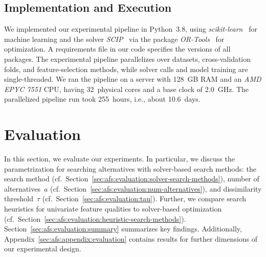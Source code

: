 \documentclass{article}
\theoremstyle{definition}
\begin{document}
\subsection{Implementation and Execution}
\label{sec:afs:experimental-design:implementation}

We implemented our experimental pipeline in Python~3.8, using \emph{scikit-learn}~\cite{pedregosa2011scikit-learn} for machine learning and the solver \emph{SCIP}~\cite{bestuzheva2021scip} via the package \emph{OR-Tools}~\cite{perron2022or-tools} for optimization.
A requirements file in our code specifies the versions of all packages.
The experimental pipeline parallelizes over datasets, cross-validation folds, and feature-selection methods, while solver calls and model training are single-threaded.
We ran the pipeline on a server with 128~GB RAM and an \emph{AMD EPYC 7551} CPU, having 32~physical cores and a base clock of 2.0~GHz.
The parallelized pipeline run took 255~hours, i.e., about 10.6~days.

\section{Evaluation}
\label{sec:afs:evaluation}

In this section, we evaluate our experiments.
In particular, we discuss the parametrization for searching alternatives with solver-based search methods: the search method (cf.~Section~\ref{sec:afs:evaluation:solver-search-methods}), number of alternatives~$a$ (cf.~Section~\ref{sec:afs:evaluation:num-alternatives}), and dissimilarity threshold~$\tau$ (cf.~Section~\ref{sec:afs:evaluation:tau}).
Further, we compare search heuristics for univariate feature qualities to solver-based optimization (cf.~Section~\ref{sec:afs:evaluation:heuristic-search-methods}).
Section~\ref{sec:afs:evaluation:summary} summarizes key findings.
Additionally, Appendix~\ref{sec:afs:appendix:evaluation} contains results for further dimensions of our experimental design.
\end{document}

